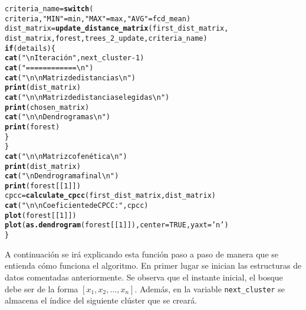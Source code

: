 \documentclass[12pt]{report}\usepackage[]{graphicx}\usepackage[dvipsnames]{xcolor}
\makeatletter
\newcommand{\hlnum}[1]{\textcolor[rgb]{0.686,0.059,0.569}{#1}}%
\newcommand{\hlstr}[1]{\textcolor[rgb]{0.192,0.494,0.8}{#1}}%
\newcommand{\hlopt}[1]{\textcolor[rgb]{0,0,0}{#1}}%
\newcommand{\hlstd}[1]{\textcolor[rgb]{0.345,0.345,0.345}{#1}}%
\newcommand{\hlkwa}[1]{\textcolor[rgb]{0.161,0.373,0.58}{\textbf{#1}}}%
\newcommand{\hlkwb}[1]{\textcolor[rgb]{0.69,0.353,0.396}{#1}}%
\newcommand{\hlkwc}[1]{\textcolor[rgb]{0.333,0.667,0.333}{#1}}%
\newcommand{\hlkwd}[1]{\textcolor[rgb]{0.737,0.353,0.396}{\textbf{#1}}}%
\newenvironment{kframe}{%
 \def\at@end@of@kframe{}%
 \ifinner\ifhmode%
  \def\at@end@of@kframe{\end{minipage}}%
  \begin{minipage}{\columnwidth}%
 \fi\fi%
 \def\FrameCommand##1{\hskip\@totalleftmargin \hskip-\fboxsep
 \colorbox{shadecolor}{##1}\hskip-\fboxsep
     \hskip-\linewidth \hskip-\@totalleftmargin \hskip\columnwidth}%
 \MakeFramed {\advance\hsize-\width
   \@totalleftmargin\z@ \linewidth\hsize
   \@setminipage}}%
 {\par\unskip\endMakeFramed%
 \at@end@of@kframe}
\newenvironment{knitrout}{}{} %
\makeatother
\begin{document}
\begin{knitrout}
\begin{kframe}
\begin{alltt}
                \hlstd{criteria_name} \hlkwb{=} \hlkwd{switch}\hlstd{(}
                        \hlstd{criteria,} \hlstr{"MIN"} \hlstd{= min,} \hlstr{"MAX"} \hlstd{= max,} \hlstr{"AVG"} \hlstd{= fcd_mean)}
                \hlstd{dist_matrix} \hlkwb{=} \hlkwd{update_distance_matrix}\hlstd{(first_dist_matrix,}
                        \hlstd{dist_matrix, forest, trees_2_update, criteria_name)}
                \hlkwa{if} \hlstd{(details) \{}
                        \hlkwd{cat}\hlstd{(}\hlstr{"\textbackslash{}nIteración"}\hlstd{, next_cluster} \hlopt{-} \hlnum{1}\hlstd{)}
                        \hlkwd{cat}\hlstd{(}\hlstr{"============\textbackslash{}n"}\hlstd{)}
                        \hlkwd{cat}\hlstd{(}\hlstr{"\textbackslash{}n\textbackslash{}nMatriz de distancias\textbackslash{}n"}\hlstd{)}
                        \hlkwd{print}\hlstd{(dist_matrix)}
                        \hlkwd{cat}\hlstd{(}\hlstr{"\textbackslash{}n\textbackslash{}nMatriz de distancias elegidas\textbackslash{}n"}\hlstd{)}
                        \hlkwd{print}\hlstd{(chosen_matrix)}
                        \hlkwd{cat}\hlstd{(}\hlstr{"\textbackslash{}n\textbackslash{}nDendrogramas\textbackslash{}n"}\hlstd{)}
                        \hlkwd{print}\hlstd{(forest)}
                \hlstd{\}}
        \hlstd{\}}
        \hlkwd{cat}\hlstd{(}\hlstr{"\textbackslash{}n\textbackslash{}nMatriz cofenética\textbackslash{}n"}\hlstd{)}
        \hlkwd{print}\hlstd{(dist_matrix)}
        \hlkwd{cat}\hlstd{(}\hlstr{"\textbackslash{}nDendrograma final\textbackslash{}n"}\hlstd{)}
        \hlkwd{print}\hlstd{(forest[[}\hlnum{1}\hlstd{]])}
        \hlstd{cpcc} \hlkwb{=} \hlkwd{calculate_cpcc}\hlstd{(first_dist_matrix, dist_matrix)}
        \hlkwd{cat}\hlstd{(}\hlstr{"\textbackslash{}n\textbackslash{}nCoeficiente de CPCC: "}\hlstd{, cpcc)}
        \hlkwd{plot}\hlstd{(forest[[}\hlnum{1}\hlstd{]])}
        \hlkwd{plot}\hlstd{(}\hlkwd{as.dendrogram}\hlstd{(forest[[}\hlnum{1}\hlstd{]]),} \hlkwc{center} \hlstd{=} \hlnum{TRUE}\hlstd{,} \hlkwc{yaxt}\hlstd{=}\hlstr{'n'}\hlstd{)}
\hlstd{\}}
\end{alltt}
\end{kframe}
\end{knitrout}
		 		
		 		A continuación se irá explicando esta función paso a paso  de manera que se entienda cómo funciona el algoritmo. En primer lugar se inician las estructuras de datos comentadas anteriormente. Se observa que el instante inicial, el bosque debe ser de la forma $[x_1, x_2, \hdots, x_n]$. Además, en la variable \texttt{next\_cluster} se almacena el índice del siguiente clúster que se creará. \\
		 		
\end{document}
